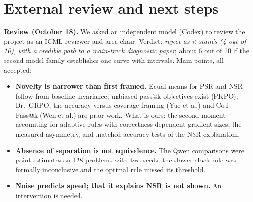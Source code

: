 \documentclass[11pt]{article}
\begin{document}
\section{External review and next steps}\label{sec:next}
\textbf{Review (October 18).} We asked an independent model (Codex) to review the project as an ICML reviewer and area chair. Verdict: \emph{reject as it stands (4 out of 10), with a credible path to a main-track diagnostic paper}; about 6 out of 10 if the second model family establishes one curve with intervals. Main points, all accepted:
\begin{itemize}[leftmargin=*,itemsep=1pt]
\item \textbf{Novelty is narrower than first framed.} Equal means for PSR and NSR follow from baseline invariance; unbiased pass@k objectives exist (PKPO); Dr.\ GRPO, the accuracy-versus-coverage framing (Yue et al.) and CoT-Pass@k (Wen et al.) are prior work. What is ours: the second-moment accounting for adaptive rules with correctness-dependent gradient sizes, the measured asymmetry, and matched-accuracy tests of the NSR explanation.
\item \textbf{Absence of separation is not equivalence.} The Qwen comparisons were point estimates on 128 problems with two seeds; the slower-clock rule was formally inconclusive and the optimal rule missed its threshold.
\item \textbf{Noise predicts speed; that it explains NSR is not shown.} An intervention is needed.
\end{itemize}
\end{document}
